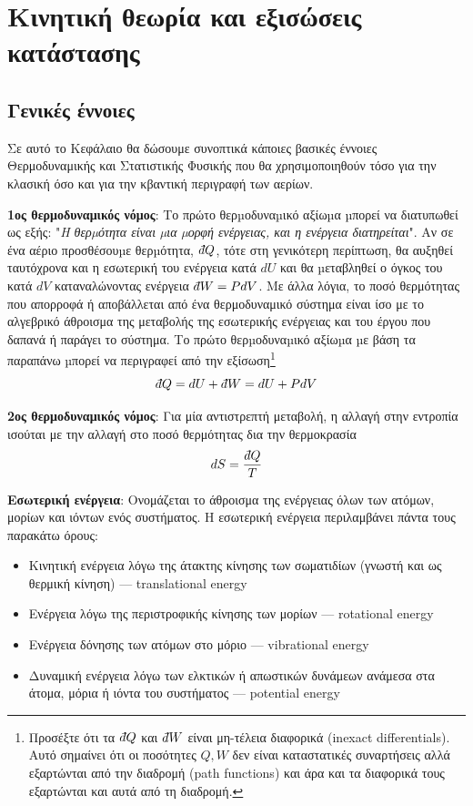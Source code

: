 \chapter{Κινητική θεωρία και εξισώσεις κατάστασης}
\label{apx:kinetic_theory}

\section{Γενικές έννοιες}
\label{apx:sec:general}
Σε αυτό το Κεφάλαιο θα δώσουμε συνοπτικά κάποιες βασικές έννοιες Θερμοδυναμικής και Στατιστικής Φυσικής που θα χρησιμοποιηθούν τόσο για την κλασική όσο και για την κβαντική περιγραφή των αερίων.

\textbf{1ος θερμοδυναμικός νόμος}: Το πρώτο θερµοδυναµικό αξίωµα µπορεί να διατυπωθεί ως εξής: "\textit{Η θερµότητα
είναι µια µορφή ενέργειας, και η ενέργεια διατηρείται}". Αν σε ένα αέριο προσθέσουµε θερµότητα, $\dbar Q$, τότε στη γενικότερη περίπτωση, θα αυξηθεί ταυτόχρονα και η εσωτερική του ενέργεια κατά $dU$ και θα µεταβληθεί ο όγκος του κατά $dV$ καταναλώνοντας ενέργεια $\dbar W = P dV$. Με άλλα λόγια, το ποσό θερμότητας που απορροφά ή αποβάλλεται από ένα θερμοδυναμικό σύστημα είναι ίσο με το αλγεβρικό άθροισμα της μεταβολής της εσωτερικής ενέργειας και του έργου που δαπανά ή παράγει το σύστημα.
Το πρώτο θερµοδυναµικό αξίωµα µε βάση τα παραπάνω µπορεί να περιγραφεί από την εξίσωση\footnote{Προσέξτε ότι τα $\dbar Q$ και $\dbar W$ είναι μη-τέλεια διαφορικά (inexact differentials). Αυτό σημαίνει ότι οι ποσότητες $Q,W$ δεν είναι καταστατικές συναρτήσεις αλλά εξαρτώνται από την διαδρομή (path functions) και άρα και τα διαφορικά τους εξαρτώνται και αυτά από τη διαδρομή.}
\begin{equation}
    \dbar Q = dU + \dbar W = dU + P dV
\end{equation}

\textbf{2ος θερμοδυναμικός νόμος}: Για μία αντιστρεπτή μεταβολή, η αλλαγή στην εντροπία ισούται με την αλλαγή στο ποσό θερμότητας δια την θερμοκρασία
\begin{equation}
    dS = \frac{\dbar Q}{T}
\end{equation}


\textbf{Εσωτερική ενέργεια}: Ονομάζεται το άθροισμα της ενέργειας όλων των ατόμων, μορίων και ιόντων ενός συστήματος. Η εσωτερική ενέργεια περιλαμβάνει πάντα τους παρακάτω όρους:
\begin{itemize}
    \item Κινητική ενέργεια λόγω της άτακτης κίνησης των σωματιδίων (γνωστή και ως θερμική κίνηση) --- translational energy
    \item Ενέργεια λόγω της περιστροφικής κίνησης των μορίων --- rotational energy
    \item Ενέργεια δόνησης των ατόμων στο μόριο --- vibrational energy
    \item Δυναμική ενέργεια λόγω των ελκτικών ή απωστικών δυνάμεων ανάμεσα στα άτομα, μόρια ή ιόντα του συστήματος --- potential energy
\end{itemize}

